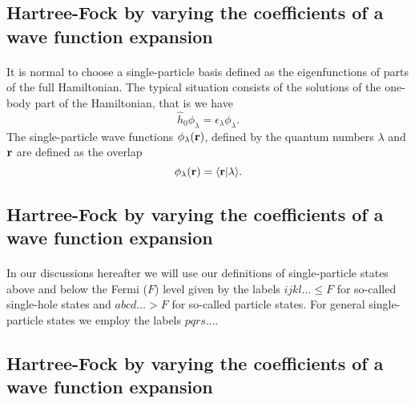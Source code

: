 \documentclass[%
twoside,                 %
final,                   %
10pt]{article}
\begin{document}
\subsection*{Hartree-Fock by varying the coefficients of a wave function expansion}

\paragraph{}
It is normal to choose a single-particle basis defined as the eigenfunctions
of parts of the full Hamiltonian. The typical situation consists of the solutions of the one-body part of the Hamiltonian, that is we have
\[
\hat{h}_0\phi_{\lambda}=\epsilon_{\lambda}\phi_{\lambda}.
\]
The single-particle wave functions $\phi_{\lambda}({\bf r})$, defined by the quantum numbers $\lambda$ and ${\bf r}$
are defined as the overlap 
\[
   \phi_{\lambda}({\bf r})  = \langle {\bf r} | \lambda \rangle .
\]



\subsection*{Hartree-Fock by varying the coefficients of a wave function expansion}

\paragraph{}
In our discussions hereafter we will use our definitions of single-particle states above and below the Fermi ($F$) level given by the labels
$ijkl\dots \le F$ for so-called single-hole states and $abcd\dots > F$ for so-called particle states.
For general single-particle states we employ the labels $pqrs\dots$.




\subsection*{Hartree-Fock by varying the coefficients of a wave function expansion}

\end{document}
